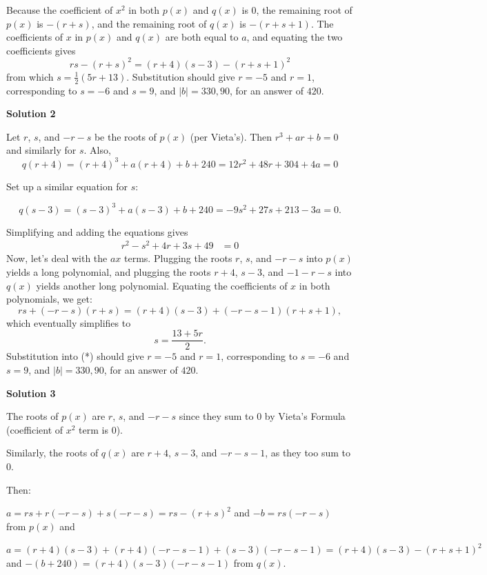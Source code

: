 \begin{enumerate}
Because the coefficient of $x^2$ in both $p(x)$ and $q(x)$ is 0, the remaining root of $p(x)$ is $-(r+s)$, and the remaining root of $q(x)$ is $-(r+s+1)$. The coefficients of $x$ in $p(x)$ and $q(x)$ are both equal to $a$, and equating the two coefficients gives
 \[rs-(r+s)^2 = (r+4)(s-3)-(r+s+1)^2\]from which $s = \frac 12 (5r+13)$. Substitution should give $r = -5$ and $r = 1$, corresponding to $s = -6$ and $s = 9$, and $|b| = 330, 90$, for an answer of $\boxed{420}$.

 



\textbf{Solution 2}

Let $r$, $s$, and $-r-s$ be the roots of $p(x)$ (per Vieta's). Then $r^3 + ar + b = 0$ and similarly for $s$. Also,
 \[q(r+4) = (r+4)^3 + a(r+4) + b  + 240 = 12r^2 + 48r + 304 + 4a = 0\]

 Set up a similar equation for $s$:

 
 \[q(s-3) = (s-3)^3 + a(s-3) + b + 240 = -9s^2 + 27s + 213 - 3a = 0.\]

 Simplifying and adding the equations gives
 \begin{align}\tag{*} r^2 - s^2 + 4r + 3s + 49 &= 0 \end{align}Now, let's deal with the $ax$ terms. Plugging the roots $r$, $s$, and $-r-s$ into $p(x)$ yields a long polynomial, and plugging the roots $r+4$, $s-3$, and $-1-r-s$ into $q(x)$ yields another long polynomial. Equating the coefficients of $x$ in both polynomials, we get:
 \[rs + (-r-s)(r+s) = (r+4)(s-3) + (-r-s-1)(r+s+1),\]which eventually simplifies to
 \[s = \frac{13 + 5r}{2}.\]Substitution into (*) should give $r = -5$ and $r = 1$, corresponding to $s = -6$ and $s = 9$, and $|b| = 330, 90$, for an answer of $\boxed{420}$.

 



\textbf{Solution 3}

The roots of $p(x)$ are $r$, $s$, and $-r-s$ since they sum to $0$ by Vieta's Formula (coefficient of $x^2$ term is $0$). 

 Similarly, the roots of $q(x)$ are $r + 4$, $s - 3$, and $-r-s-1$, as they too sum to $0$. 

 Then:

 $a = rs+r(-r-s)+s(-r-s) = rs-(r+s)^2$ and $-b = rs(-r-s)$ from $p(x)$ and 

 $a=(r+4)(s-3)+(r+4)(-r-s-1)+(s-3)(-r-s-1) = (r+4)(s-3)-(r+s+1)^2$ and $-(b+240)=(r+4)(s-3)(-r-s-1)$ from $q(x)$. 


\end{enumerate}
